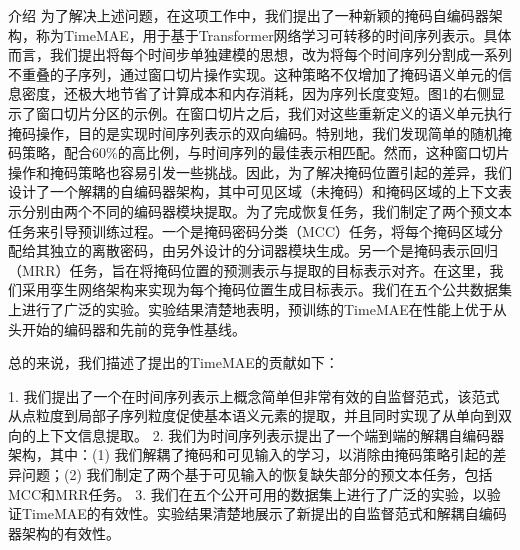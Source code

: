 \documentclass[a4paper,12pt]{article}
\begin{document}
\begin{section}{介绍}
为了解决上述问题，在这项工作中，我们提出了一种新颖的掩码自编码器架构，称为TimeMAE，用于基于Transformer网络学习可转移的时间序列表示。具体而言，我们提出将每个时间步单独建模的思想，改为将每个时间序列分割成一系列不重叠的子序列，通过窗口切片操作实现。这种策略不仅增加了掩码语义单元的信息密度，还极大地节省了计算成本和内存消耗，因为序列长度变短。图1的右侧显示了窗口切片分区的示例。在窗口切片之后，我们对这些重新定义的语义单元执行掩码操作，目的是实现时间序列表示的双向编码。特别地，我们发现简单的随机掩码策略，配合60\%的高比例，与时间序列的最佳表示相匹配。然而，这种窗口切片操作和掩码策略也容易引发一些挑战。因此，为了解决掩码位置引起的差异，我们设计了一个解耦的自编码器架构，其中可见区域（未掩码）和掩码区域的上下文表示分别由两个不同的编码器模块提取。为了完成恢复任务，我们制定了两个预文本任务来引导预训练过程。一个是掩码密码分类（MCC）任务，将每个掩码区域分配给其独立的离散密码，由另外设计的分词器模块生成。另一个是掩码表示回归（MRR）任务，旨在将掩码位置的预测表示与提取的目标表示对齐。在这里，我们采用孪生网络架构来实现为每个掩码位置生成目标表示。我们在五个公共数据集上进行了广泛的实验。实验结果清楚地表明，预训练的TimeMAE在性能上优于从头开始的编码器和先前的竞争性基线。

总的来说，我们描述了提出的TimeMAE的贡献如下：

1. 我们提出了一个在时间序列表示上概念简单但非常有效的自监督范式，该范式从点粒度到局部子序列粒度促使基本语义元素的提取，并且同时实现了从单向到双向的上下文信息提取。
2. 我们为时间序列表示提出了一个端到端的解耦自编码器架构，其中：(1) 我们解耦了掩码和可见输入的学习，以消除由掩码策略引起的差异问题；(2) 我们制定了两个基于可见输入的恢复缺失部分的预文本任务，包括MCC和MRR任务。
3. 我们在五个公开可用的数据集上进行了广泛的实验，以验证TimeMAE的有效性。实验结果清楚地展示了新提出的自监督范式和解耦自编码器架构的有效性。

\end{section}
\end{document}
